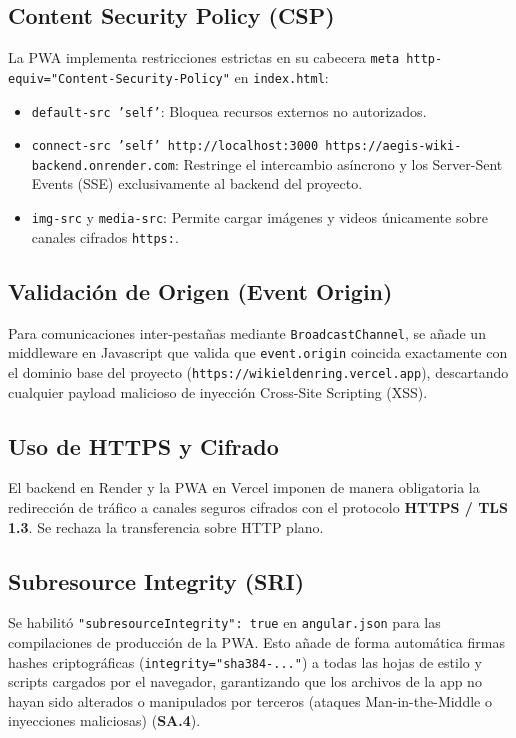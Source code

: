 \documentclass[11pt,a4paper]{article}
\begin{document}
\subsection{Content Security Policy (CSP)}
La PWA implementa restricciones estrictas en su cabecera \texttt{meta http-equiv="Content-Security-Policy"} en \texttt{index.html}:
\begin{itemize}
    \item \texttt{default-src 'self'}: Bloquea recursos externos no autorizados.
    \item \texttt{connect-src 'self' http://localhost:3000 https://aegis-wiki-backend.onrender.com}: Restringe el intercambio asíncrono y los Server-Sent Events (SSE) exclusivamente al backend del proyecto.
    \item \texttt{img-src} y \texttt{media-src}: Permite cargar imágenes y videos únicamente sobre canales cifrados \texttt{https:}.
\end{itemize}

\subsection{Validación de Origen (Event Origin)}
Para comunicaciones inter-pestañas mediante \texttt{BroadcastChannel}, se añade un middleware en Javascript que valida que \texttt{event.origin} coincida exactamente con el dominio base del proyecto (\texttt{https://wikieldenring.vercel.app}), descartando cualquier payload malicioso de inyección Cross-Site Scripting (XSS).

\subsection{Uso de HTTPS y Cifrado}
El backend en Render y la PWA en Vercel imponen de manera obligatoria la redirección de tráfico a canales seguros cifrados con el protocolo \textbf{HTTPS / TLS 1.3}. Se rechaza la transferencia sobre HTTP plano.

\subsection{Subresource Integrity (SRI)}
Se habilitó \texttt{"subresourceIntegrity": true} en \texttt{angular.json} para las compilaciones de producción de la PWA. Esto añade de forma automática firmas hashes criptográficas (\texttt{integrity="sha384-..."}) a todas las hojas de estilo y scripts cargados por el navegador, garantizando que los archivos de la app no hayan sido alterados o manipulados por terceros (ataques Man-in-the-Middle o inyecciones maliciosas) (\textbf{SA.4}).
\end{document}
